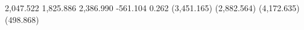 {\trowd\intbl{}\trqc{} \pard\intbl\ql \cell \pard\intbl\tqdec{} { 2,047.522}\cell \pard\intbl\tqdec{} { 1,825.886}\cell \pard\intbl\tqdec{} { 2,386.990}\cell \pard\intbl\tqdec{} { -561.104}\cell \pard\intbl\tqdec{} { 0.262}\cell\row
\trowd\intbl{}\trqc\clbrdrb\brdrs{}\clbrdrb\brdrs{}\clbrdrb\brdrs{}\clbrdrb\brdrs{}\clbrdrb\brdrs{}\clbrdrb\brdrs{} \pard\intbl\ql \cell \pard\intbl\tqdec{} { (3,451.165)}\cell \pard\intbl\tqdec{} { (2,882.564)}\cell \pard\intbl\tqdec{} { (4,172.635)}\cell \pard\intbl\tqdec{} { (498.868)}\cell \pard\intbl\tqdec{} { }\cell\row
\pard{}\par
}

